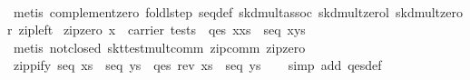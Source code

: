\begin{isabellebody}
%
\isadelimproof
\ \ %
\endisadelimproof
%
\isatagproof
{}\isamarkupfalse%
\ {}metis\ complement{}zero\ foldl{}step\ seq{}def\ skd{}mult{}assoc\ skd{}mult{}zerol\ skd{}mult{}zeror\ zip{}left{}%
\endisatagproof
{\isafoldproof}%
%
\isadelimproof
\isanewline
%
\endisadelimproof
\isanewline
{}\isamarkupfalse%
\ zip{}zero{}{}\ {}x\ {}\ carrier\ tests\ {}\ qes\ {}{}x{}xs{}\ {}\ seq\ {}x{}ys{}\ {}\ {}{}\isanewline
%
\isadelimproof
\ \ %
\endisadelimproof
%
\isatagproof
{}\isamarkupfalse%
\ {}metis\ not{}closed\ skt{}test{}mult{}comm\ zip{}comm\ zip{}zero{}{}%
\endisatagproof
{\isafoldproof}%
%
\isadelimproof
\isanewline
%
\endisadelimproof
\isanewline
{}\isamarkupfalse%
\ zippify{}\ {}seq\ xs\ {}\ seq\ ys\ {}\ qes\ {}rev\ xs{}\ {}\ seq\ ys{}\isanewline
%
\isadelimproof
\ \ %
\endisadelimproof
%
\isatagproof
{}\isamarkupfalse%
\ {}simp\ add{}\ qes{}def{}%

\end{isabellebody}

